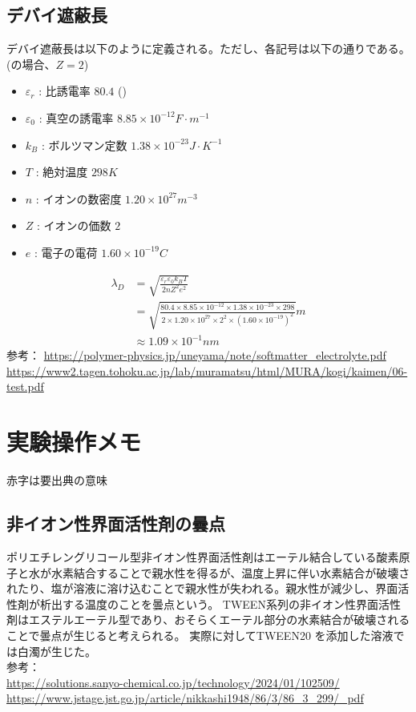 \documentclass{ltjsarticle}
\begin{document}
\subsection{デバイ遮蔽長}
デバイ遮蔽長は以下のように定義される。ただし、各記号は以下の通りである。(の場合、$Z=2$)
\begin{itemize}
  \item $\varepsilon_r$ : 比誘電率 $80.4$ ()
  \item $\varepsilon_0$ : 真空の誘電率 $8.85\times 10^{-12} \si{F\cdot m^{-1}}$
  \item $k_B$ : ボルツマン定数 $1.38\times 10^{-23} \si{J\cdot K^{-1}}$
  \item $T$ : 絶対温度 $298 \si{K}$
  \item $n$ : イオンの数密度 $1.20\times 10^{27} \si{m^{-3}}$
  \item $Z$ : イオンの価数 $2$
  \item $e$ : 電子の電荷 $1.60\times 10^{-19} \si{C}$
\end{itemize}
\begin{equation}
  \begin{split}
    \lambda_D&=\sqrt{\frac{\varepsilon_r \varepsilon_0 k_BT}{2nZ^2e^2}}\\
    &=\sqrt{\frac{80.4\times 8.85\times 10^{-12}\times 1.38\times 10^{-23}\times 298}{2\times 1.20\times 10^{27}\times 2^2\times (1.60\times 10^{-19})^2}} \si{m}\\
    &\approx 1.09 \times 10^{-1} \si{nm}
  \end{split}
\end{equation}
参考：
\url{https://polymer-physics.jp/uneyama/note/softmatter_electrolyte.pdf}\\
\url{https://www2.tagen.tohoku.ac.jp/lab/muramatsu/html/MURA/kogi/kaimen/06-test.pdf}\\

\section{実験操作メモ}
赤字は要出典の意味
\subsection{非イオン性界面活性剤の曇点}
ポリエチレングリコール型非イオン性界面活性剤はエーテル結合している酸素原子と水が水素結合することで親水性を得るが、温度上昇に伴い水素結合が破壊されたり、塩が溶液に溶け込むことで親水性が失われる。親水性が減少し、界面活性剤が析出する温度のことを曇点という。
TWEEN系列の非イオン性界面活性剤はエステルエーテル型であり、おそらくエーテル部分の水素結合が破壊されることで曇点が生じると考えられる。
実際に対してTWEEN20  を添加した溶液では白濁が生じた。\\
参考：\\
\url{https://solutions.sanyo-chemical.co.jp/technology/2024/01/102509/}\\
\url{https://www.jstage.jst.go.jp/article/nikkashi1948/86/3/86_3_299/_pdf}
\end{document}
